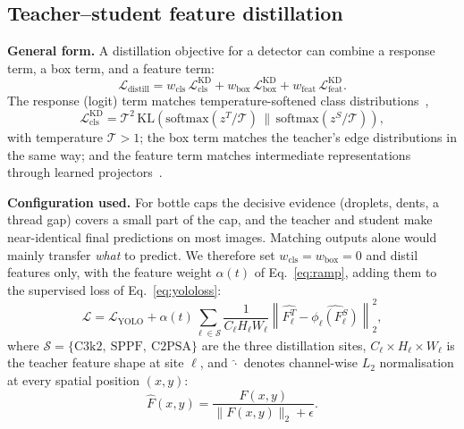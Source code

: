 \subsection{Teacher--student feature distillation}
\label{sec:kd-impl}

\noindent\textbf{General form.} A distillation objective for a detector can combine a response term, a box term, and a feature term:
\begin{equation}
    \mathcal{L}_{\text{distill}} = w_{\text{cls}}\,\mathcal{L}^{\text{KD}}_{\text{cls}} + w_{\text{box}}\,\mathcal{L}^{\text{KD}}_{\text{box}} + w_{\text{feat}}\,\mathcal{L}^{\text{KD}}_{\text{feat}}.
    \label{eq:distill-general}
\end{equation}
The response (logit) term matches temperature-softened class distributions~\cite{hinton2015},
\begin{equation}
    \mathcal{L}^{\text{KD}}_{\text{cls}} = \mathcal{T}^2\,\mathrm{KL}\!\left(\mathrm{softmax}(z^T/\mathcal{T})\,\Big\|\,\mathrm{softmax}(z^S/\mathcal{T})\right),
    \label{eq:logitkd}
\end{equation}
with temperature $\mathcal{T}>1$; the box term matches the teacher's edge distributions in the same way; and the feature term matches intermediate representations through learned projectors~\cite{romero2015}.

\noindent\textbf{Configuration used.} For bottle caps the decisive evidence (droplets, dents, a thread gap) covers a small part of the cap, and the teacher and student make near-identical final predictions on most images. Matching outputs alone would mainly transfer \emph{what} to predict. We therefore set $w_{\text{cls}}=w_{\text{box}}=0$ and distil features only, with the feature weight $\alpha(t)$ of Eq.~\eqref{eq:ramp}, adding them to the supervised loss of Eq.~\eqref{eq:yololoss}:
\begin{equation}
    \mathcal{L} = \mathcal{L}_{\text{YOLO}} + \alpha(t)\sum_{\ell\in\mathcal{S}} \frac{1}{C_\ell H_\ell W_\ell}\left\| \widehat{F^T_\ell} - \widehat{\phi_\ell(F^S_\ell)} \right\|_2^2 ,
    \label{eq:kd}
\end{equation}
where $\mathcal{S}=\{\text{C3k2},\ \text{SPPF},\ \text{C2PSA}\}$ are the three distillation sites, $C_\ell\times H_\ell\times W_\ell$ is the teacher feature shape at site $\ell$, and $\widehat{\cdot}$ denotes channel-wise $L_2$ normalisation at every spatial position $(x,y)$:
\begin{equation}
    \widehat{F}(x,y) = \frac{F(x,y)}{\|F(x,y)\|_2+\epsilon}.
    \label{eq:l2norm}
\end{equation}


